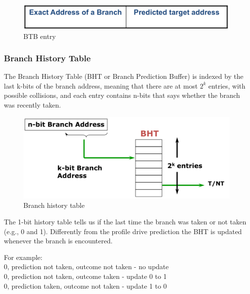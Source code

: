 \begin{figure}[H]
    \centering
    \includegraphics[scale = 0.4]{images/branch-target-buffer-entry}
    \caption{BTB entry}
    \label{fig:btb-entry}
\end{figure}


\subsubsection{Branch History Table}
The Branch History Table (BHT or Branch Prediction Buffer) is indexed by the last k-bits of the branch address, meaning
that there are at most $2^k$ entries, with possible collisions, and each entry contains n-bits that says whether the
branch was recently taken.

\begin{figure}[H]
    \centering
    \includegraphics[scale = 0.4]{images/branch-history-table}
    \caption{Branch history table}
    \label{fig:branch-history-table}
\end{figure}

The 1-bit history table tells us if the last time the branch was taken or not taken (e.g., 0 and 1).
Differently from the profile drive prediction the BHT is updated whenever the branch is encountered.

For example:\\
0, prediction not taken, outcome not taken - no update\\
0, prediction not taken, outcome taken - update 0 to 1\\
0, prediction taken, outcome not taken - update 1 to 0\\

